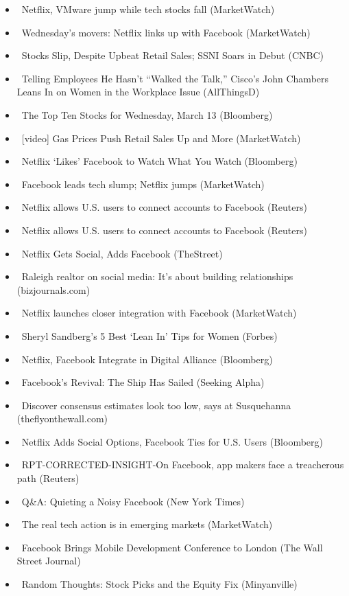 \documentclass[11pt,asymmetric]{article}
\begin{document}
\begin{itemize}
\item\ Netflix, VMware jump while tech stocks fall (MarketWatch)
\item\ Wednesday’s movers: Netflix links up with Facebook (MarketWatch)
\item\ Stocks Slip, Despite Upbeat Retail Sales; SSNI Soars in Debut (CNBC)
\item\ Telling Employees He Hasn't ``Walked the Talk,'' Cisco's John Chambers Leans In on Women in the Workplace Issue (AllThingsD)
\item\ The Top Ten Stocks for Wednesday, March 13 (Bloomberg)
\item\ [video] Gas Prices Push Retail Sales Up and More (MarketWatch)
\item\ Netflix `Likes' Facebook to Watch What You Watch (Bloomberg)
\item\ Facebook leads tech slump; Netflix jumps (MarketWatch)
\item\ Netflix allows U.S. users to connect accounts to Facebook (Reuters)
\item\ Netflix allows U.S. users to connect accounts to Facebook (Reuters)
\item\ Netflix Gets Social, Adds Facebook (TheStreet)
\item\ Raleigh realtor on social media: It’s about building relationships (bizjournals.com)
\item\ Netflix launches closer integration with Facebook (MarketWatch)
\item\ Sheryl Sandberg's 5 Best `Lean In' Tips for Women (Forbes)
\item\ Netflix, Facebook Integrate in Digital Alliance (Bloomberg)
\item\ Facebook's Revival: The Ship Has Sailed (Seeking Alpha)
\item\ Discover consensus estimates look too low, says at Susquehanna (theflyonthewall.com)
\item\ Netflix Adds Social Options, Facebook Ties for U.S. Users (Bloomberg)
\item\ RPT-CORRECTED-INSIGHT-On Facebook, app makers face a treacherous path (Reuters)
\item\ Q\&A: Quieting a Noisy Facebook (New York Times)
\item\ The real tech action is in emerging markets (MarketWatch)
\item\ Facebook Brings Mobile Development Conference to London (The Wall Street Journal)
\item\ Random Thoughts: Stock Picks and the Equity Fix (Minyanville)

\end{itemize}
\end{document}
